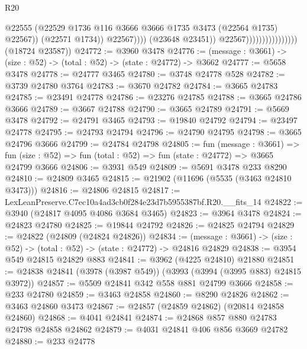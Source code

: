 \begin{lexlean}{R20}
\begin{coremodule}
                                                    @22555
                                                    (@22529
                                                      @1736
                                                      @116
                                                      @3666
                                                      @3666
                                                      @1735
                                                      @3473
                                                      (@22564 @1735)
                                                      @22567))
                                                  (@22571 @1734))
                                                @22567))))
                                        (@23648 @23451))
                                      @22567))))))))))))))))
      (@18724 @23587))
@24772 := @3960 @3478
@24776 := (message : @3661) -> (size : @52) -> (total : @52) -> (state : @24772) -> @3662
@24777 := @5658 @3478
@24778 := @24777 @3465
@24780 := @3748 @24778 @528
@24782 := @3739 @24780 @3764
@24783 := @3670 @24782
@24784 := @3665 @24783
@24785 := @23491 @24778
@24786 := @23276 @24785
@24788 := @3665 @24786 @3666
@24789 := @3667 @24788
@24790 := @3665 @24789
@24791 := @5669 @3478
@24792 := @24791 @3465
@24793 := @19840 @24792
@24794 := @23497 @24778
@24795 := @24793 @24794
@24796 := @24790 @24795
@24798 := @3665 @24796 @3666
@24799 := @24784 @24798
@24805 := fun (message : @3661) =>
  fun (size : @52) => fun (total : @52) => fun (state : @24772) => @3665 @24799 @3666
@24806 := @3931 @549
@24809 := @5691 @3478 @233 @8290
@24810 := @24809 @3465
@24815 := @21902 (@11696 (@5535 (@3463 @24810 @3473)))
@24816 := @24806 @24815
@24817 := LexLeanPreserve.C7ec10a4ad3cb0f284e23d7b5955387bf.R20.__fits_14
@24822 := @3940 (@24817 @4095 @4086 @3684 @3465)
@24823 := @3964 @3478
@24824 := @24823 @24780
@24825 := @19844 @24792
@24826 := @24825 @24794
@24829 := @24822 (@24809 (@24824 @24826))
@24834 := (message : @3661) -> (size : @52) -> (total : @52) -> (state : @24772) -> @24816 @24829
@24838 := @3954 @549 @24815 @24829 @883
@24841 := @3962 (@4225 @24810) @21880
@24851 := @24838 @24841 (@3978 (@3987 @549)) (@3993 (@3994 (@3995 @883) @24815 @3972))
@24857 := @5509 @24841 @342 @558 @881 @24799 @3666
@24858 := @233 @24780
@24859 := @3463 @24858
@24860 := @8290 @24826
@24862 := @3463 @24860 @3473
@24867 := @24857 (@24859 @24862) (@20814 @24858 @24860)
@24868 := @4041 @24841
@24874 := @24868 @857 @880 @24783 @24798 @24858 @24862
@24879 := @4031 @24841 @406 @856 @3669 @24782
@24880 := @233 @24778

\end{coremodule}
\end{lexlean}
